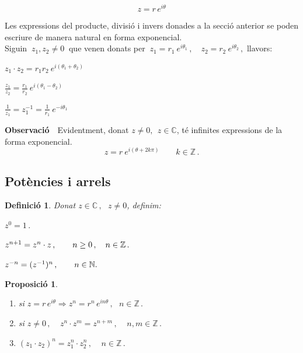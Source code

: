 \documentclass[12pt]{article}
\newcommand{\observacio}{\textbf{Observaci{\'o}}\ \ }
\newtheorem{definicio}{Definici{\'o}}[subsection]
\newtheorem{proposicio}{Proposici{\'o}}[subsection]
\newcommand{\C}{\mathbb{C}}
\begin{document}
$$
z=r\,e^{i\theta}
$$

Les expressions del producte, divisi{\'o} i invers donades a la
secci{\'o} anterior se poden escriure de manera natural en forma
exponencial.\\

Siguin $\ z_1,z_2\neq0\ $ que venen donats per $\ z_1=r_1\
e^{i\theta_1}\,,\quad z_2=r_2\ e^{i\theta_2}\,,$ llavors:
\begin{center}
$z_1\cdot z_2=r_1 r_2\ e^{i(\theta_1+\theta_2)}$

\vspace{0.3cm} $\displaystyle\frac{z_1}{z_2}=\frac{r_1}{r_2}\
e^{i(\theta_1-\theta_2)}$

\vspace{0.3cm}$\displaystyle\frac{1}{z_1}=z^{-1}_1=\frac{1}{r_1}\
e^{-i\theta_1}$
\end{center}

\vspace{0.4cm}
\observacio Evidentment, donat $z\neq0,\ \ z\in \C$, t\'{e}
infinites expressions de la forma exponencial.
$$z=r\ e^{i(\theta+2k\pi)}\qquad k\in \mathbb{Z}\,.$$


\subsection{Pot{\`e}ncies i arrels}

\vspace{0.4cm}
\begin{definicio}
Donat $z\in \C\,,\ \ \ z\neq 0$, definim:

\hspace{1.5cm}$z^0=1\,.$

\hspace{1.5cm} $z^{n+1}=z^n\cdot z\,,\hspace{0.7cm} n\geq0\,,\ \ \
n\in \mathbb{Z}\,.$\

\hspace{1.5cm} $z^{-n}=(z^{-1})^n\,,\hspace{0.7cm} n\in \mathbb{N}.$
\end{definicio}

\vspace{0.4cm}
\begin{proposicio}

\begin{enumerate}

\item[a)] si $z=r\, e^{i\theta}\Longrightarrow z^{n}=r^{n}\, e^{in\theta}\,, \ \ \ n\in
\mathbb{Z}\,.$
\itemindent=1.5cm
    \item[b)] si $z\neq 0\,,\ \ \ \ \ z^n\cdot z^m=z^{n+m}\,, \ \ \ \ \ n,m\in \mathbb{Z}\,.$
    \item[c)] $(z_1\cdot z_2)^n=z_1^n\cdot z_2^n\,, \ \ \ \ \ n\in \mathbb{Z}\,.$
\end{enumerate}
\end{proposicio}
\end{document}
